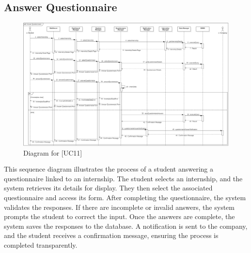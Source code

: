 \subsection{Answer Questionnaire}
\begin{figure} [H]
    \centering
    \includegraphics[width=1\linewidth]{DD/Images/Runtime Sequence Diagram Images/answer_questionnaire.png}
    \caption{Diagram for [UC11]}
    \label{fig: Answer Questionnaire Diagram}
\end{figure}
This sequence diagram illustrates the process of a student answering a questionnaire linked to an internship. The student selects an internship, and the system retrieves its details for display. They then select the associated questionnaire and access its form. After completing the questionnaire, the system validates the responses. If there are incomplete or invalid answers, the system prompts the student to correct the input. Once the answers are complete, the system saves the responses to the database. A notification is sent to the company, and the student receives a confirmation message, ensuring the process is completed transparently.

